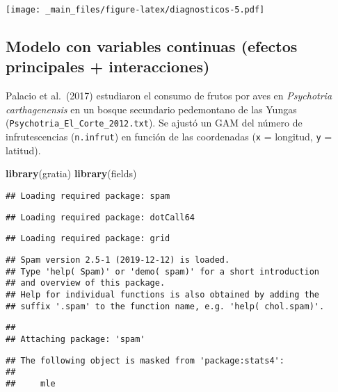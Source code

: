 \documentclass[
]{book}
\newenvironment{Shaded}{\begin{snugshade}}{\end{snugshade}}
\newcommand{\KeywordTok}[1]{\textcolor[rgb]{0.13,0.29,0.53}{\textbf{#1}}}
\newcommand{\NormalTok}[1]{#1}
\begin{document}
\texttt{[image: \_main\_files/figure-latex/diagnosticos-5.pdf]}

\hypertarget{modelo-con-variables-continuas-efectos-principales-interacciones}{%
\subsection{Modelo con variables continuas (efectos principales + interacciones)}\label{modelo-con-variables-continuas-efectos-principales-interacciones}}

Palacio et al.~(2017) estudiaron el consumo de frutos por aves en \emph{Psychotria carthagenensis} en un bosque secundario pedemontano de las Yungas (\texttt{Psychotria\_El\_Corte\_2012.txt}). Se ajustó un GAM del número de infrutescencias (\texttt{n.infrut}) en función de las coordenadas (\texttt{x} = longitud, \texttt{y} = latitud).

\begin{Shaded}
\begin{Highlighting}[]
\KeywordTok{library}\NormalTok{(gratia)}
\KeywordTok{library}\NormalTok{(fields)}
\end{Highlighting}
\end{Shaded}

\begin{verbatim}
## Loading required package: spam
\end{verbatim}

\begin{verbatim}
## Loading required package: dotCall64
\end{verbatim}

\begin{verbatim}
## Loading required package: grid
\end{verbatim}

\begin{verbatim}
## Spam version 2.5-1 (2019-12-12) is loaded.
## Type 'help( Spam)' or 'demo( spam)' for a short introduction 
## and overview of this package.
## Help for individual functions is also obtained by adding the
## suffix '.spam' to the function name, e.g. 'help( chol.spam)'.
\end{verbatim}

\begin{verbatim}
## 
## Attaching package: 'spam'
\end{verbatim}

\begin{verbatim}
## The following object is masked from 'package:stats4':
## 
##     mle
\end{verbatim}
\end{document}
